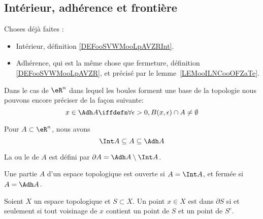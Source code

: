 \subsection{Intérieur, adhérence et frontière}

\begin{normaltext}
	Choses déjà faites :
	\begin{itemize}
		\item
		      Intérieur, définition \ref{DEFooSVWMooLpAVZRInt}.
		\item
		      Adhérence, qui est la même chose que fermeture, définition \ref{DEFooSVWMooLpAVZR}, et précisé par le lemme~\ref{LEMooILNCooOFZaTe}.
	\end{itemize}

	Dans le cas de \( \eR^n\) dans lequel les boules forment une base de la topologie nous pouvons encore préciser de la façon suivante:
	\begin{equation}
		x \in \Adh A \iffdefn \forall \epsilon > 0, B(x,\epsilon) \cap A \neq \emptyset
	\end{equation}
\end{normaltext}

\begin{proposition}
	Pour \( A \subset \eR^n\), nous avons
	\begin{equation*}
		\Int A \subseteq A  \subseteq \Adh A
	\end{equation*}
\end{proposition}

\begin{definition}      \label{DEFooACVLooRwehTl}
	La  ou le  de \( A\) est défini par \( \partial A = \Adh A \setminus \Int A\).
\end{definition}

\begin{lemma}       \label{LEMooMPZWooGrqYIX}
	Une partie \( A\) d'un espace topologique est ouverte si \( A = \Int A\), et fermée si \( A = \Adh A\).
\end{lemma}

\begin{lemma}      \label{LEMooEUYEooYcUfKr}
	Soient \( X\) un espace topologique et \( S\subset X\). Un point \( x\in X\) est dans \( \partial S\) si et seulement si tout voisinage de \( x\) contient un point de \( S\) et un point de \( S^c\).
\end{lemma}

